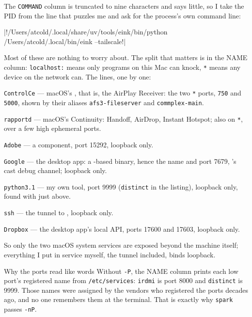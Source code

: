 \documentclass[11pt,a4paper]{article}
\begin{document}
The \texttt{COMMAND} column is truncated to nine characters and says little, so I take the PID from the line that puzzles me and ask  for the process's own command line:

\begin{cmdout}
|!/Users/atcold/.local/share/uv/tools/eink/bin/python /Users/atcold/.local/bin/eink --tailscale!|
\end{cmdout}

Most of these are nothing to worry about. The split that matters is in the NAME column: \texttt{localhost:} means only programs on this Mac can knock, \texttt{*} means any device on the network can. The lines, one by one:

\begin{compactitemize}
  \item \texttt{ControlCe} — macOS's , that is, the AirPlay Receiver: the two \texttt{*} ports, \texttt{750} and \texttt{5000}, shown by their aliases \texttt{afs3-fileserver} and \texttt{commplex-main}.
  \item \texttt{rapportd} — macOS's Continuity: Handoff, AirDrop, Instant Hotspot; also on \texttt{*}, over a few high ephemeral ports.
  \item \texttt{Adobe} — a  component, port 15292, loopback only.
  \item \texttt{Google} — the  desktop app: a -based binary, hence the name and port 7679, 's cast debug channel; loopback only.
  \item \texttt{python3.1} — my own  tool, port 9999 (\texttt{distinct} in the listing), loopback only, found with  just above.
  \item \texttt{ssh} — the tunnel to , loopback only.
  \item \texttt{Dropbox} — the desktop app's local API, ports 17600 and 17603, loopback only.
\end{compactitemize}

So only the two macOS system services are exposed beyond the machine itself; everything I put in service myself, the tunnel included, binds loopback.

\begin{insight}{Why the ports read like words}
Without \texttt{-P}, the NAME column prints each low port's registered name from \texttt{/etc/services}: \texttt{irdmi} is port 8000 and \texttt{distinct} is 9999. Those names were assigned by the vendors who registered the ports decades ago, and no one remembers them at the terminal. That is exactly why \texttt{spark} passes \texttt{-nP}.
\end{insight}
\end{document}

